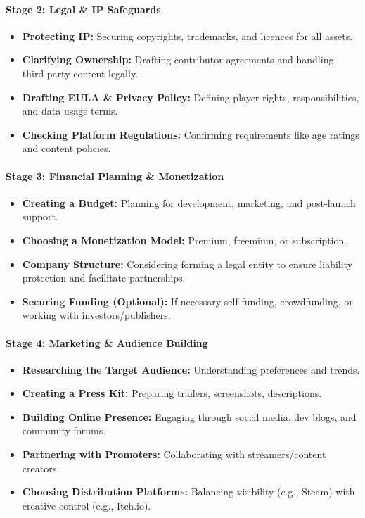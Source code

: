 \paragraph{\large Stage 2: Legal \& IP Safeguards}
\begin{itemize}
    \item \textbf{Protecting IP:} Securing copyrights, trademarks, and licences for all assets.
    \item \textbf{Clarifying Ownership:} Drafting contributor agreements and handling third-party content legally.
    \item \textbf{Drafting EULA \& Privacy Policy:} Defining player rights, responsibilities, and data usage terms.
    \item \textbf{Checking Platform Regulations:} Confirming requirements like age ratings and content policies.
\end{itemize}
\paragraph{\large Stage 3: Financial Planning \& Monetization}
\begin{itemize}
    \item \textbf{Creating a Budget:} Planning for development, marketing, and post-launch support.
    \item \textbf{Choosing a Monetization Model:} Premium, freemium, or subscription.
    \item \textbf{Company Structure:} Considering forming a legal entity to ensure liability protection and facilitate partnerships.
    \item \textbf{Securing Funding (Optional):} If necessary self-funding, crowdfunding, or working with investors/publishers.
\end{itemize}
\paragraph{\large Stage 4: Marketing \& Audience Building}
\begin{itemize}
    \item \textbf{Researching the Target Audience:} Understanding preferences and trends.
    \item \textbf{Creating a Press Kit:} Preparing trailers, screenshots, descriptions.
    \item \textbf{Building Online Presence:} Engaging through social media, dev blogs, and community forums.
    \item \textbf{Partnering with Promoters:} Collaborating with streamers/content creators.
    \item \textbf{Choosing Distribution Platforms:} Balancing visibility (e.g., Steam) with creative control (e.g., Itch.io).
\end{itemize}
